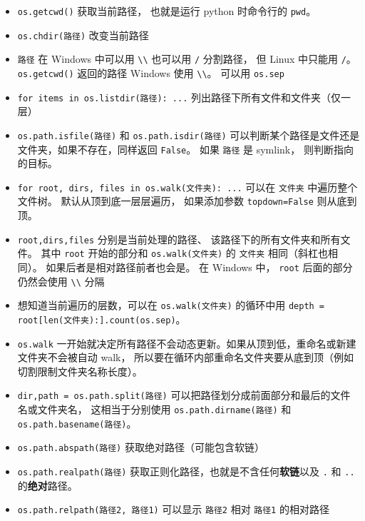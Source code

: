 
\begin{issues}
\issueDraft
\end{issues}

\begin{itemize}
\item \verb`os.getcwd()` 获取当前路径， 也就是运行 python 时命令行的 \verb`pwd`。
\item \verb`os.chdir(路径)` 改变当前路径 
\item \verb`路径` 在 Windows 中可以用 \verb`\\` 也可以用 \verb`/` 分割路径， 但 Linux 中只能用 \verb`/`。 \verb`os.getcwd()` 返回的路径 Windows 使用 \verb`\\`。 可以用 \verb`os.sep` 
\item \verb`for items in os.listdir(路径): ...` 列出路径下所有文件和文件夹（仅一层）
\item \verb`os.path.isfile(路径)` 和 \verb`os.path.isdir(路径)` 可以判断某个路径是文件还是文件夹，如果不存在，同样返回 \verb`False`。 如果 \verb`路径` 是 symlink， 则判断指向的目标。
\item \verb`for root, dirs, files in os.walk(文件夹): ...` 可以在 \verb`文件夹` 中遍历整个文件树。 默认从顶到底一层层遍历， 如果添加参数 \verb`topdown=False` 则从底到顶。
\item \verb`root,dirs,files` 分别是当前处理的路径、 该路径下的所有文件夹和所有文件。 其中 \verb`root` 开始的部分和 \verb`os.walk(文件夹)` 的 \verb`文件夹` 相同（斜杠也相同）。 如果后者是相对路径前者也会是。 在 Windows 中， \verb`root` 后面的部分仍然会使用 \verb`\\` 分隔
\item 想知道当前遍历的层数，可以在 \verb`os.walk(文件夹)` 的循环中用 \verb`depth = root[len(文件夹):].count(os.sep)`。
\item \verb`os.walk` 一开始就决定所有路径不会动态更新。如果从顶到低，重命名或新建文件夹不会被自动 walk， 所以要在循环内部重命名文件夹要从底到顶（例如切割限制文件夹名称长度）。
\item \verb`dir,path = os.path.split(路径)` 可以把路径划分成前面部分和最后的文件名或文件夹名， 这相当于分别使用 \verb`os.path.dirname(路径)` 和 \verb`os.path.basename(路径)`。
\item \verb`os.path.abspath(路径)` 获取绝对路径（可能包含软链）
\item \verb`os.path.realpath(路径)` 获取正则化路径，也就是不含任何\textbf{软链}以及 \verb`.` 和 \verb`..` 的\textbf{绝对}路径。
\item \verb`os.path.relpath(路径2, 路径1)` 可以显示 \verb`路径2` 相对 \verb`路径1` 的相对路径

\end{itemize}
